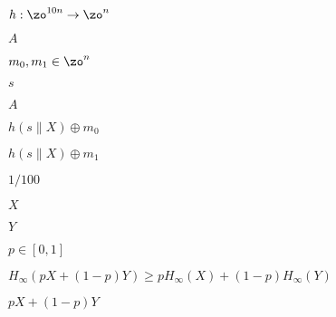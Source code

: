 \documentclass[10pt]{book}
\begin{document}
\begin{mdSnippets}
\begin{mdInlineSnippet}[f5b9a1e43c795ba8f25b4492787aa34a]%
$h:\zo^{10n}\rightarrow\zo^n$\end{mdInlineSnippet}%
\begin{mdInlineSnippet}[7fc56270e7a70fa81a5935b72eacbe29]%
$A$\end{mdInlineSnippet}%
\begin{mdInlineSnippet}%
$m_0,m_1\in\zo^n$\end{mdInlineSnippet}%
\begin{mdInlineSnippet}[03c7c0ace395d80182db07ae2c30f034]%
$s$\end{mdInlineSnippet}%
\begin{mdInlineSnippet}[7fc56270e7a70fa81a5935b72eacbe29]%
$A$\end{mdInlineSnippet}%
\begin{mdInlineSnippet}[11eabd97e4170662dc605b2c981aa517]%
$h(s\|X)\oplus m_0$\end{mdInlineSnippet}%
\begin{mdInlineSnippet}%
$h(s\|X)\oplus m_1$\end{mdInlineSnippet}%
\begin{mdInlineSnippet}[9508f797f871052cfe8a901284497ab2]%
$1/100$\end{mdInlineSnippet}%
\begin{mdInlineSnippet}[02129bb861061d1a052c592e2dc6b383]%
$X$\end{mdInlineSnippet}%
\begin{mdInlineSnippet}[57cec4137b614c87cb4e24a3d003a3e0]%
$Y$\end{mdInlineSnippet}%
\begin{mdInlineSnippet}[550abf67410399d394e58560a62f657a]%
$p\in [0,1]$\end{mdInlineSnippet}%
\begin{mdInlineSnippet}[d0895924fe6a22f3b82e2739669263b0]%
$H_{\infty}(pX+(1-p)Y)\geq pH_{\infty}(X)+(1-p)H_{\infty}(Y)$\end{mdInlineSnippet}%
\begin{mdInlineSnippet}%
$pX+(1-p)Y$\end{mdInlineSnippet}%

\end{mdSnippets}
\end{document}
